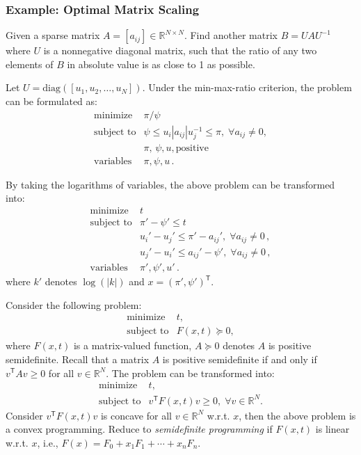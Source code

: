 \documentclass[final,leqno]{siamltex}
\begin{document}
\hypertarget{sec:example-optimal-matrix-scaling}{%
\subsubsection{Example: Optimal Matrix Scaling}\label{sec:example-optimal-matrix-scaling}}

Given a sparse matrix \(A = [a_{ij}] \in \mathbb{R}^{N\times N}\).
Find another matrix \(B = U A U^{-1}\) where \(U\) is a nonnegative diagonal matrix, such that the ratio of any two elements of \(B\) in absolute value is as close to 1 as possible.

Let \(U = \mathrm{diag}([u_1, u_2, \ldots, u_N])\). Under the min-max-ratio criterion, the problem can be formulated as:
\[\begin{array}{ll}
    \text{minimize}   &  \pi/\psi  \\
    \text{subject to} &  \psi \leq u_i |a_{ij}| u_j^{-1} \leq \pi, \; 
                                            \forall a_{ij} \neq 0 , \\
                      &  \pi, \, \psi, u, \text{positive} \\
    \text{variables}  &  \pi, \psi, u \, .
  \end{array}
\]

By taking the logarithms of variables, the above problem can be transformed
into:
\[\begin{array}{ll}
    \text{minimize}   &  t \\
    \text{subject to} &  \pi' - \psi' \leq t \\
                      &  u_i' - u_j'  \leq \pi' - a_{ij}', \; \forall a_{ij} \neq 0 \,, \\
                      &  u_j' - u_i' \leq a_{ij}' - \psi', \; \forall a_{ij} \neq 0 \,, \\
    \text{variables}  &  \pi', \psi', u' \, .
  \end{array}
\]
where \(k'\) denotes \(\log( | k | )\) and \(x = (\pi', \psi' )^\mathsf{T}\).

Consider the following problem:
\[\begin{array}{ll}
    \text{minimize}    & t, \\
    \text{subject to}  & F(x, t) \succeq 0,
  \end{array}
\]
where \(F(x, t)\) is a matrix-valued function, \(A \succeq 0\) denotes \(A\) is positive semidefinite. Recall that a matrix \(A\) is positive semidefinite if and only if \(v^\mathsf{T} A v \ge 0\) for all \(v \in \mathbb{R}^N\). The problem can be transformed into:
\[\begin{array}{ll}
        \text{minimize}      & t, \\
        \text{subject to}    & v^\mathsf{T} F(x, t) v \ge 0, \; \forall v \in \mathbb{R}^N.
  \end{array}
\]
Consider \(v^\mathsf{T} F(x, t) v\) is concave for all \(v \in \mathbb{R}^N\) w.r.t. \(x\), then the above problem is a convex programming. Reduce to \emph{semidefinite programming} if \(F(x, t)\) is linear w.r.t. \(x\), i.e., \(F(x) = F_0 + x_1 F_1 + \cdots + x_n F_n\).
\end{document}
